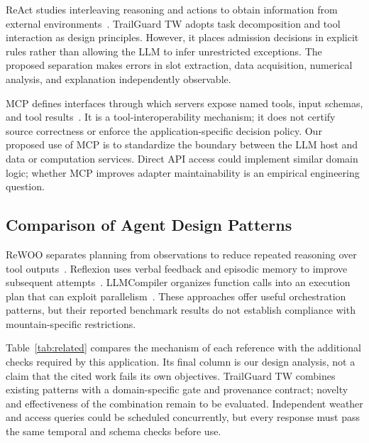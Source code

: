\documentclass[conference]{IEEEtran}
\begin{document}
ReAct studies interleaving reasoning and actions to obtain information from external environments~\cite{react}. TrailGuard TW adopts task decomposition and tool interaction as design principles. However, it places admission decisions in explicit rules rather than allowing the LLM to infer unrestricted exceptions. The proposed separation makes errors in slot extraction, data acquisition, numerical analysis, and explanation independently observable.

MCP defines interfaces through which servers expose named tools, input schemas, and tool results~\cite{mcp}. It is a tool-interoperability mechanism; it does not certify source correctness or enforce the application-specific decision policy. Our proposed use of MCP is to standardize the boundary between the LLM host and data or computation services. Direct API access could implement similar domain logic; whether MCP improves adapter maintainability is an empirical engineering question.

\subsection{Comparison of Agent Design Patterns}
ReWOO separates planning from observations to reduce repeated reasoning over tool outputs~\cite{rewoo}. Reflexion uses verbal feedback and episodic memory to improve subsequent attempts~\cite{reflexion}. LLMCompiler organizes function calls into an execution plan that can exploit parallelism~\cite{llmcompiler}. These approaches offer useful orchestration patterns, but their reported benchmark results do not establish compliance with mountain-specific restrictions.

Table~\ref{tab:related} compares the mechanism of each reference with the additional checks required by this application. Its final column is our design analysis, not a claim that the cited work fails its own objectives. TrailGuard TW combines existing patterns with a domain-specific gate and provenance contract; novelty and effectiveness of the combination remain to be evaluated. Independent weather and access queries could be scheduled concurrently, but every response must pass the same temporal and schema checks before use.
\end{document}
